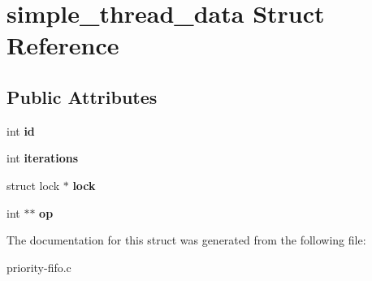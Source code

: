 \hypertarget{structsimple__thread__data}{}\section{simple\+\_\+thread\+\_\+data Struct Reference}
\label{structsimple__thread__data}
\subsection*{Public Attributes}
\begin{DoxyCompactItemize}
\item 
int {\bfseries id}\hypertarget{structsimple__thread__data_aeed05b8121b6e0d94787827fcaa7b34b}{}\label{structsimple__thread__data_aeed05b8121b6e0d94787827fcaa7b34b}

\item 
int {\bfseries iterations}\hypertarget{structsimple__thread__data_a9a1ef486ced79aaa97358e813c8fa02d}{}\label{structsimple__thread__data_a9a1ef486ced79aaa97358e813c8fa02d}

\item 
struct lock $\ast$ {\bfseries lock}\hypertarget{structsimple__thread__data_abf83bd1ceec2d5754e7ebf2d5fda35bb}{}\label{structsimple__thread__data_abf83bd1ceec2d5754e7ebf2d5fda35bb}

\item 
int $\ast$$\ast$ {\bfseries op}\hypertarget{structsimple__thread__data_a3ed4d074e3525610b50ec8fca097a628}{}\label{structsimple__thread__data_a3ed4d074e3525610b50ec8fca097a628}

\end{DoxyCompactItemize}


The documentation for this struct was generated from the following file\+:\begin{DoxyCompactItemize}
\item 
priority-\/fifo.\+c\end{DoxyCompactItemize}
